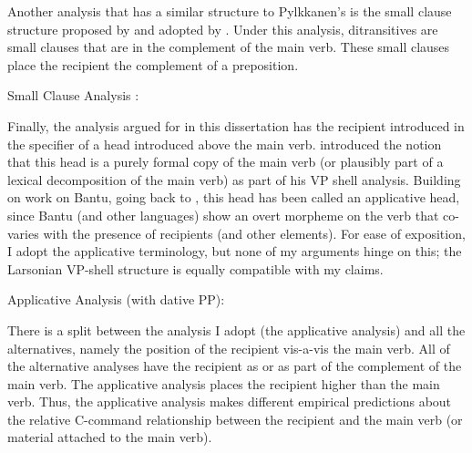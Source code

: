 Another analysis that has a similar structure to Pylkkanen's is the small clause structure proposed by \cite{DenDikken.1995} and adopted by \cite{Harley.2002,Harley.2015,Ormazabal.2012}. Under this analysis, ditransitives are small clauses that are in the complement of the main verb. These small clauses place the recipient the complement of a preposition.

\begin{exe}
	\ex Small Clause Analysis \citep[ simplified from ex. 38]{DenDikken.1995}:\\
\end{exe}

Finally, the analysis argued for in this dissertation has the recipient introduced in the specifier of a head introduced above the main verb. \cite{Larson.1988} introduced the notion that this head is a purely formal copy of the main verb (or plausibly part of a lexical decomposition of the main verb) as part of his VP shell analysis. Building on work on Bantu, going back to \cite{Baker.1988b}, this head has been called an applicative head, since Bantu (and other languages) show an overt morpheme on the verb that co-varies with the presence of recipients (and other elements). For ease of exposition, I adopt the applicative terminology, but none of my arguments hinge on this; the Larsonian VP-shell structure is equally compatible with my claims.

\begin{exe}
	\ex Applicative Analysis (with dative PP):\\

\end{exe}

There is a split between the analysis I adopt (the applicative analysis) and all the alternatives, namely the position of the recipient vis-a-vis the main verb. All of the alternative analyses have the recipient as or as part of the complement of the main verb. The applicative analysis places the recipient higher than the main verb. Thus, the applicative analysis makes different empirical predictions about the relative C-command relationship between the recipient and the main verb (or material attached to the main verb).

